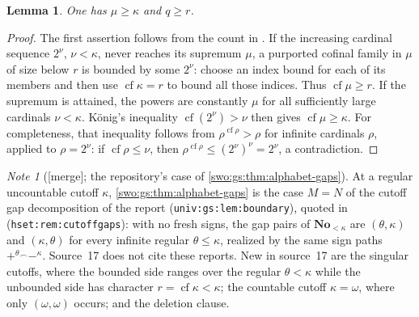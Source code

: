 \documentclass[11pt]{article}
\newtheorem{lemma}[lemma]{Lemma}
\theoremstyle{definition}
\theoremstyle{remark}
\newtheorem{note}[note]{Note}
\newcommand{\No}{\mathbf{No}}
\newcommand{\cf}{\operatorname{cf}}
\newcommand{\cat}{\mathbin{{}^\frown}}
\newcommand{\code}[1]{\texttt{\small #1}}
\newcommand{\merge}{\textsf{[merge]}}
\begin{document}
\begin{lemma}\label{swo:gs:lem:cofinality-inequality}
One has $\mu\ge\kappa$ and $q\ge r$.
\end{lemma}
\begin{proof}
The first assertion follows from the count in
. If the increasing cardinal sequence
$2^\nu$, $\nu<\kappa$, never reaches its supremum $\mu$, a purported
cofinal family in $\mu$ of size below $r$ is bounded by some $2^\nu$:
choose an index bound for each of its members and then use
$\cf\kappa=r$ to bound all those indices. Thus $\cf\mu\ge r$.
If the supremum is attained, the powers are constantly $\mu$ for all
sufficiently large cardinals $\nu<\kappa$. K\"onig's inequality
$\cf(2^\nu)>\nu$ then gives $\cf\mu\ge\kappa$. For completeness, that
inequality follows from $\rho^{\cf\rho}>\rho$ for infinite cardinals
$\rho$, applied to $\rho=2^\nu$: if $\cf\rho\le\nu$, then
$\rho^{\cf\rho}\le(2^\nu)^\nu=2^\nu$, a contradiction.
\end{proof}

\begin{note}[\merge; the repository's case of \cref{swo:gs:thm:alphabet-gaps}]\label{swo:vi:note:alphabet-univ}
At a regular uncountable cutoff $\kappa$, \cref{swo:gs:thm:alphabet-gaps} is
the case $M=N$ of the cutoff gap decomposition of the report
 (\code{univ:gs:lem:boundary}), quoted in
 (\code{hset:rem:cutoffgaps}): with
no fresh signs, the gap pairs of $\No_{<\kappa}$ are $(\theta,\kappa)$ and
$(\kappa,\theta)$ for every infinite regular $\theta\le\kappa$, realized by the
same sign paths $+^\theta\cat-^\kappa$. Source~17 does not cite these reports.
New in source~17 are the singular cutoffs, where the bounded side ranges over
the regular $\theta<\kappa$ while the unbounded side has character
$r=\cf\kappa<\kappa$; the countable cutoff $\kappa=\omega$, where only
$(\omega,\omega)$ occurs; and the deletion clause.
\end{note}
\end{document}

